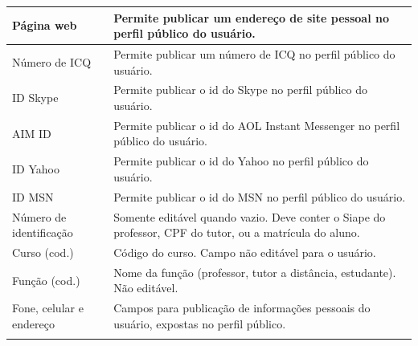 \begin{longtable}{p{4cm}|p{9cm}}
    Página web & Permite publicar um endereço de site pessoal no perfil público do usuário. \\\hline
    Número de ICQ & Permite publicar um número de ICQ no perfil público do usuário. \\\hline
    ID Skype   & Permite publicar o id do Skype no perfil público do usuário. \\\hline
    AIM ID     & Permite publicar o id do AOL Instant Messenger no perfil público do usuário. \\\hline
    ID Yahoo   & Permite publicar o id do Yahoo no perfil público do usuário. \\\hline
    ID MSN     & Permite publicar o id do MSN no perfil público do usuário. \\\hline
    Número de identificação & Somente editável quando vazio. Deve conter o Siape do professor, CPF do tutor, ou a matrícula do aluno. \\\hline
    Curso (cod.) & Código do curso. Campo não editável para o usuário. \\\hline
    Função (cod.) & Nome da função (professor, tutor a distância, estudante). Não editável. \\\hline
    Fone, celular e endereço & Campos para publicação de informações pessoais do usuário, expostas no perfil público. \\\hline
    \label{tab:addlabel}
\end{longtable}%

% 
% 
% 
% 

